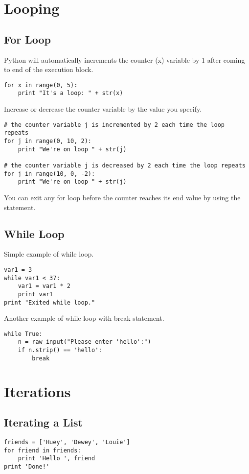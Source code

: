 \documentclass[a4paper,9pt]{extarticle}
\begin{document}
\begin{multicols*}{2}
\section{Looping}

\subsection{For Loop}
Python will automatically increments the counter (x) variable by 1 after coming to end of the execution block.
\begin{lstlisting}
for x in range(0, 5):
    print "It's a loop: " + str(x)
\end{lstlisting}

Increase or decrease the counter variable by the value you specify.
\begin{lstlisting}
# the counter variable j is incremented by 2 each time the loop repeats
for j in range(0, 10, 2):
    print "We're on loop " + str(j)

# the counter variable j is decreased by 2 each time the loop repeats
for j in range(10, 0, -2):
    print "We're on loop " + str(j)
\end{lstlisting}

You can exit any for loop before the counter reaches its end value by using the  statement.

\subsection{While Loop}
Simple example of while loop.
\begin{lstlisting}
var1 = 3
while var1 < 37:
    var1 = var1 * 2
    print var1
print "Exited while loop."
\end{lstlisting}

Another example of while loop with break statement.
\begin{lstlisting}
while True:
    n = raw_input("Please enter 'hello':")
    if n.strip() == 'hello':
        break
\end{lstlisting}

\section{Iterations}

\subsection{Iterating a List}
\begin{lstlisting}
friends = ['Huey', 'Dewey', 'Louie']
for friend in friends:
    print 'Hello ', friend
print 'Done!'
\end{lstlisting}


\end{multicols*}
\end{document}
